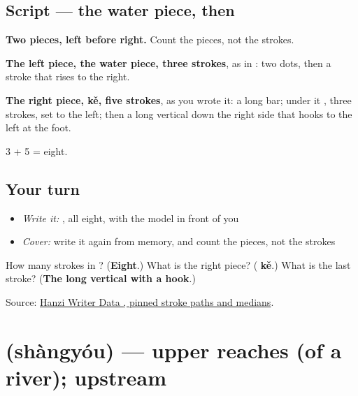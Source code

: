 \subsection*{Script — the water piece, then }

\begin{quote}
\end{quote}

\textbf{Two pieces, left before right.} Count the pieces, not the strokes.

\textbf{The left piece, the water piece, three strokes}, as in : two dots, then a stroke that rises to the right.

\textbf{The right piece,  kě, five strokes}, as you wrote it: a long bar; under it , three strokes, set to the left; then a long vertical down the right side that hooks to the left at the foot.

3 + 5 = eight.

\subsection*{Your turn}
\begin{itemize}
\raggedright
  \item \emph{Write it:} , all eight, with the model in front of you
  \item \emph{Cover:} write it again from memory, and count the pieces, not the strokes
\end{itemize}

\begin{tcolorbox}[breakable,colback=teal!4,colframe=teal!35!black,title={Before you move on}]
How many strokes in ? (\textbf{Eight}.) What is the right piece? (\textbf{ kě}.) What is the last stroke? (\textbf{The long vertical with a hook}.)

Source: \href{https://raw.githubusercontent.com/chanind/hanzi-writer-data/68d10a4b21150cae5e1ebbd223eed289cf32d90c/data/\%E6\%B2\%B3.json}{Hanzi Writer Data , pinned stroke paths and medians}.
\end{tcolorbox}
\section[\texorpdfstring{\zh{上游} (shàngyóu)}{上游 (shàngyóu)}]{ (shàngyóu) — upper reaches (of a river); upstream}

